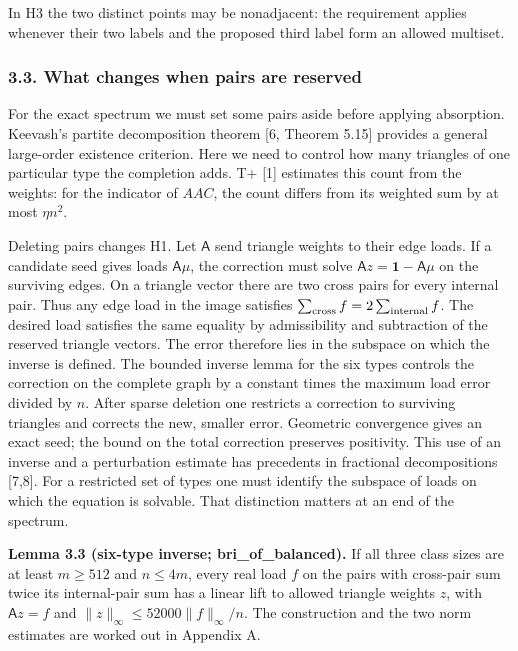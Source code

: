 \documentclass[english,11pt,a4paper]{article}
\begin{document}
In H3 the two distinct points may be nonadjacent: the requirement applies whenever their two labels and the proposed third label form an allowed multiset.

\subsubsection{3.3. What changes when pairs are reserved}\label{what-changes-when-pairs-are-reserved}

For the exact spectrum we must set some pairs aside before applying absorption. Keevash's partite decomposition theorem {[}6, Theorem 5.15{]} provides a general large-order existence criterion. Here we need to control how many triangles of one particular type the completion adds. T+ {[}1{]} estimates this count from the weights: for the indicator of \(AAC\), the count differs from its weighted sum by at most \(\eta n^2\).

Deleting pairs changes H1. Let \(\mathsf A\) send triangle weights to their edge loads. If a candidate seed gives loads \(\mathsf A\mu\), the correction must solve \(\mathsf A z=\mathbf1-\mathsf A\mu\) on the surviving edges. On a triangle vector there are two cross pairs for every internal pair. Thus any edge load in the image satisfies \(\sum_{\rm cross} f=2\sum_{\rm internal} f\). The desired load satisfies the same equality by admissibility and subtraction of the reserved triangle vectors. The error therefore lies in the subspace on which the inverse is defined. The bounded inverse lemma for the six types controls the correction on the complete graph by a constant times the maximum load error divided by \(n\). After sparse deletion one restricts a correction to surviving triangles and corrects the new, smaller error. Geometric convergence gives an exact seed; the bound on the total correction preserves positivity. This use of an inverse and a perturbation estimate has precedents in fractional decompositions {[}7,8{]}. For a restricted set of types one must identify the subspace of loads on which the equation is solvable. That distinction matters at an end of the spectrum.

\textbf{Lemma 3.3 (six-type inverse; bri\_of\_balanced).} If all three class sizes are at least \(m\ge512\) and \(n\le4m\), every real load \(f\) on the pairs with cross-pair sum twice its internal-pair sum has a linear lift to allowed triangle weights \(z\), with \(\mathsf A z=f\) and \(\|z\|_\infty\le52000\|f\|_\infty/n\). The construction and the two norm estimates are worked out in Appendix A.
\end{document}
